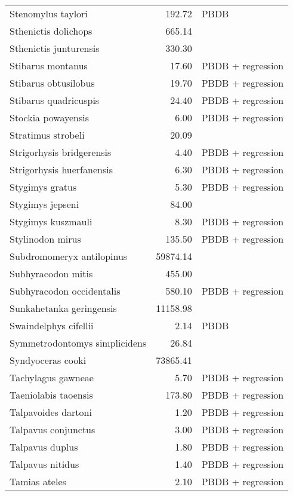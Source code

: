 \begin{table}[ht]
\begin{tabular}{lrl}
  Stenomylus taylori & 192.72 & PBDB \\ 
  Sthenictis dolichops & 665.14 & \cite{Tomiya2013} \\ 
  Sthenictis junturensis & 330.30 & \cite{Tomiya2013} \\ 
  Stibarus montanus & 17.60 & PBDB + regression \\ 
  Stibarus obtusilobus & 19.70 & PBDB + regression \\ 
  Stibarus quadricuspis & 24.40 & PBDB + regression \\ 
  Stockia powayensis & 6.00 & PBDB + regression \\ 
  Stratimus strobeli & 20.09 & \cite{Tomiya2013} \\ 
  Strigorhysis bridgerensis & 4.40 & PBDB + regression \\ 
  Strigorhysis huerfanensis & 6.30 & PBDB + regression \\ 
  Stygimys gratus & 5.30 & PBDB + regression \\ 
  Stygimys jepseni & 84.00 & \cite{Wilson2012} \\ 
  Stygimys kuszmauli & 8.30 & PBDB + regression \\ 
  Stylinodon mirus & 135.50 & PBDB + regression \\ 
  Subdromomeryx antilopinus & 59874.14 & \cite{Tomiya2013} \\ 
  Subhyracodon mitis & 455.00 & \cite{Scott1940} \\ 
  Subhyracodon occidentalis & 580.10 & PBDB + regression \\ 
  Sunkahetanka geringensis & 11158.98 & \cite{Tomiya2013} \\ 
  Swaindelphys cifellii & 2.14 & PBDB \\ 
  Symmetrodontomys simplicidens & 26.84 & \cite{Tomiya2013} \\ 
  Syndyoceras cooki & 73865.41 & \cite{Tomiya2013} \\ 
  Tachylagus gawneae & 5.70 & PBDB + regression \\ 
  Taeniolabis taoensis & 173.80 & PBDB + regression \\ 
  Talpavoides dartoni & 1.20 & PBDB + regression \\ 
  Talpavus conjunctus & 3.00 & PBDB + regression \\ 
  Talpavus duplus & 1.80 & PBDB + regression \\ 
  Talpavus nitidus & 1.40 & PBDB + regression \\ 
  Tamias ateles & 2.10 & PBDB + regression \\ 

\end{tabular}
\end{table}
